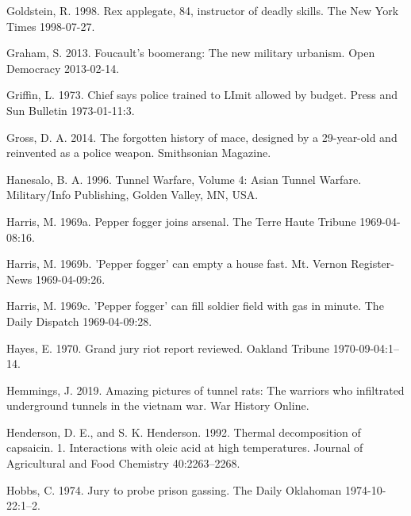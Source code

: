 \documentclass[
  11pt,
]{krantz}
\newlength{\cslhangindent}
\newenvironment{CSLReferences}[2] %
 {%
  \setlength{\parindent}{0pt}
  \ifodd #1 \everypar{\setlength{\hangindent}{\cslhangindent}}\ignorespaces\fi
  \ifnum #2 > 0
  \setlength{\parskip}{#2\baselineskip}
  \fi
 }%
 {}
\begin{document}
\begin{CSLReferences}{1}{0}
\leavevmode{}%
Goldstein, R. 1998. Rex applegate, 84, instructor of deadly skills. The New York Times 1998-07-27.

\leavevmode{}%
Graham, S. 2013. Foucault's boomerang: The new military urbanism. Open Democracy 2013-02-14.

\leavevmode{}%
Griffin, L. 1973. Chief says police trained to LImit allowed by budget. Press and Sun Bulletin 1973-01-11:3.

\leavevmode{}%
Gross, D. A. 2014. The forgotten history of mace, designed by a 29-year-old and reinvented as a police weapon. Smithsonian Magazine.

\leavevmode{}%
Hanesalo, B. A. 1996. {Tunnel Warfare, Volume 4: Asian Tunnel Warfare}. Military/Info Publishing, Golden Valley, MN, USA.

\leavevmode{}%
Harris, M. 1969a. Pepper fogger joins arsenal. The Terre Haute Tribune 1969-04-08:16.

\leavevmode{}%
Harris, M. 1969b. 'Pepper fogger' can empty a house fast. Mt. Vernon Register-News 1969-04-09:26.

\leavevmode{}%
Harris, M. 1969c. 'Pepper fogger' can fill soldier field with gas in minute. The Daily Dispatch 1969-04-09:28.

\leavevmode{}%
Hayes, E. 1970. Grand jury riot report reviewed. Oakland Tribune 1970-09-04:1--14.

\leavevmode{}%
Hemmings, J. 2019. Amazing pictures of tunnel rats: The warriors who infiltrated underground tunnels in the vietnam war. War History Online.

\leavevmode{}%
Henderson, D. E., and S. K. Henderson. 1992. Thermal decomposition of capsaicin. 1. Interactions with oleic acid at high temperatures. Journal of Agricultural and Food Chemistry 40:2263--2268.

\leavevmode{}%
Hobbs, C. 1974. Jury to probe prison gassing. The Daily Oklahoman 1974-10-22:1--2.


\end{CSLReferences}
\end{document}

